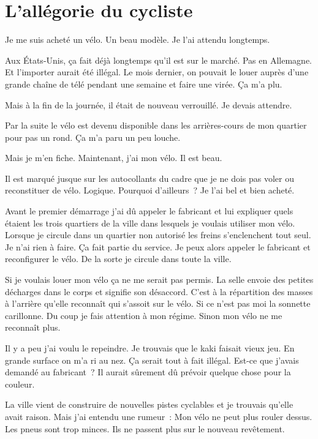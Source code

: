 \chapter{L'allégorie du cycliste}\label{cycliste}

Je me suis acheté un vélo. Un beau modèle. Je l’ai attendu longtemps.

Aux États-Unis, ça fait déjà longtemps qu’il est sur le marché. Pas en Allemagne. Et l’importer aurait été illégal. Le mois dernier, on pouvait le louer auprès d’une grande chaîne de télé pendant une
semaine et faire une virée. Ça m’a plu.

Mais à la fin de la journée, il était de nouveau verrouillé. Je devais attendre.

Par la suite le vélo est devenu disponible dans les arrières-cours de mon quartier pour pas un rond. Ça m’a paru un peu louche.

Mais je m’en fiche. Maintenant, j’ai mon vélo. Il est beau.

Il est marqué jusque sur les autocollants du cadre que je ne dois pas voler ou reconstituer de vélo. Logique. Pourquoi d’ailleurs~? Je l’ai bel et bien acheté.

Avant le premier démarrage j’ai dû appeler le fabricant et lui expliquer quels étaient les trois quartiers de la ville dans lesquels je voulais utiliser mon vélo. Lorsque je circule dans un quartier
non autorisé les freins s’enclenchent tout seul. Je n’ai rien à faire. Ça fait partie du service. Je peux alors appeler le fabricant et reconfigurer le vélo. De la sorte je circule dans toute la
ville.

Si je voulais louer mon vélo ça ne me serait pas permis. La selle envoie des petites décharges dans le corps et signifie son désaccord. C’est à la répartition des masses à l’arrière qu’elle reconnaît
qui s’assoit sur le vélo. Si ce n’est pas moi la sonnette carillonne. Du coup je fais attention à mon régime. Sinon mon vélo ne me reconnaît plus.

Il y a peu j’ai voulu le repeindre. Je trouvais que le kaki faisait vieux jeu. En grande surface on m’a ri au nez. Ça serait tout à fait illégal. Est-ce que j’avais demandé au fabricant~? Il aurait
sûrement dû prévoir quelque chose pour la couleur.

La ville vient de construire de nouvelles pistes cyclables et je trouvais qu’elle avait raison. Mais j’ai entendu une rumeur~: Mon vélo ne peut plus rouler dessus. Les pneus sont trop minces. Ils ne
passent plus sur le nouveau revêtement.

